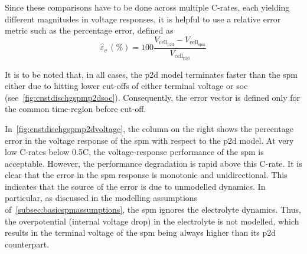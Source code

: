Since  these comparisons have
to  be done  across  multiple  C-rates, each  yielding  different magnitudes  in
voltage responses,  it is  helpful to use  a relative error  metric such  as the
percentage error, defined as
\begin{equation}
    \hat{\varepsilon}_v\,(\si{\percent}) = 100\frac{V_{\text{cell}_\text{p2d}} - V_{\text{cell}_\text{spm}}}{V_{\text{cell}_\text{p2d}}}
\end{equation}

It is to be noted that, in all cases, the \gls{p2d} model terminates faster than
the \gls{spm} either due to hitting lower cut-offs of either terminal voltage or
\gls{soc} (see~\cref{fig:cnstdischgspmp2dsoc}).  Consequently, the  error vector
is defined only for the common time-region before cut-off.

In~\cref{fig:cnstdischgspmp2dvoltage},  the  column  on   the  right  shows  the
percentage error  in the voltage response  of the \gls{spm} with  respect to the
\gls{p2d} model.  At very  low C-rates  below \approx0.5C,  the voltage-response
performance of the \gls{spm} is acceptable. However, the performance degradation
is rapid above this C-rate. It is clear that the error in the \gls{spm} response
is monotonic and unidirectional. This indicates  that the source of the error is
due  to  unmodelled dynamics.  In  particular,  as  discussed in  the  modelling
assumptions  of~\cref{subsec:basicspmassumptions},  the  \gls{spm}  ignores  the
electrolyte dynamics.  Thus, the  overpotential (internal  voltage drop)  in the
electrolyte  is not  modelled,  which results  in the  terminal  voltage of  the
\gls{spm} being always higher than its \gls{p2d} counterpart.

